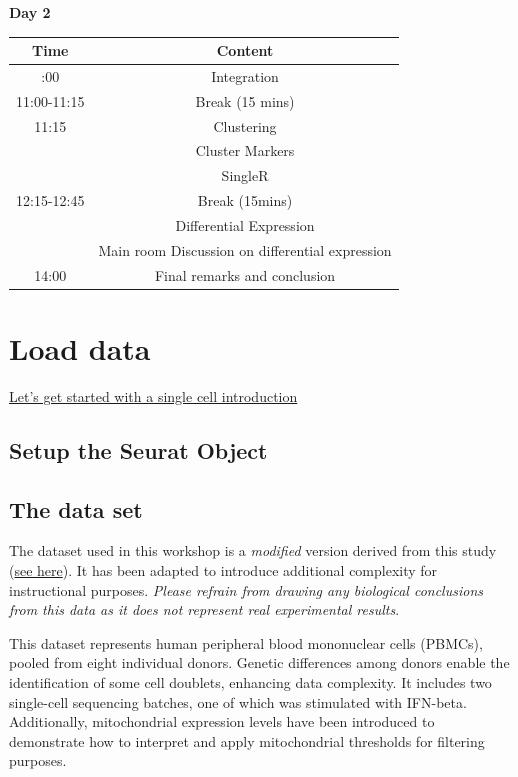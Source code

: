 \documentclass[
]{book}
\begin{document}
\textbf{Day 2}

\begin{longtable}[]{@{}cc@{}}
\toprule\noalign{}
Time & Content \\
\midrule\noalign{}
\endhead
\bottomrule\noalign{}
\endlastfoot
10:00 & Integration \\
11:00-11:15 & Break (15 mins) \\
11:15 & Clustering \\
& Cluster Markers \\
& SingleR \\
12:15-12:45 & Break (15mins) \\
& Differential Expression \\
& Main room Discussion on differential expression \\
14:00 & Final remarks and conclusion \\
\end{longtable}

\chapter{Load data}\label{load}

\href{https://docs.google.com/presentation/d/1yKxSWL_sYto-alC-1BXIk1WbSnIGxnky/edit\#slide=id.p1}{Let's get started with a single cell introduction}

\section{Setup the Seurat Object}\label{setup-the-seurat-object}

\section{The data set}\label{the-data-set}

The dataset used in this workshop is a \emph{modified} version derived from this study (\href{https://pubmed.ncbi.nlm.nih.gov/29227470/}{see here}). It has been adapted to introduce additional complexity for instructional purposes. \emph{Please refrain from drawing any biological conclusions from this data as it does not represent real experimental results}.

This dataset represents human peripheral blood mononuclear cells (PBMCs), pooled from eight individual donors. Genetic differences among donors enable the identification of some cell doublets, enhancing data complexity. It includes two single-cell sequencing batches, one of which was stimulated with IFN-beta. Additionally, mitochondrial expression levels have been introduced to demonstrate how to interpret and apply mitochondrial thresholds for filtering purposes.
\end{document}
